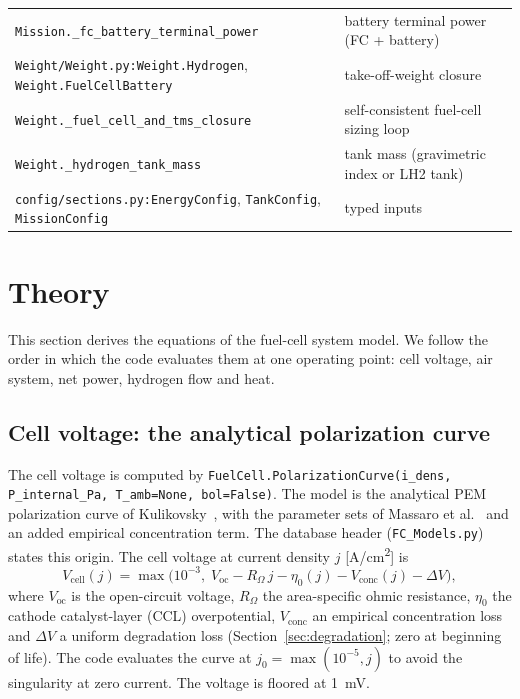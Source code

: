 \documentclass[a4paper,11pt]{article}
\newcommand{\fn}[1]{\nolinkurl{#1}}
\begin{document}
\begin{table}[ht]
\begin{tabularx}{\textwidth}{@{}lX@{}}
\fn{Mission._fc_battery_terminal_power} & battery terminal power (FC + battery) \\
\fn{Weight/Weight.py:Weight.Hydrogen}, \fn{Weight.FuelCellBattery} & take-off-weight closure \\
\fn{Weight._fuel_cell_and_tms_closure} & self-consistent fuel-cell sizing loop \\
\fn{Weight._hydrogen_tank_mass} & tank mass (gravimetric index or LH2 tank) \\
\fn{config/sections.py:EnergyConfig}, \fn{TankConfig}, \fn{MissionConfig} & typed inputs \\
\bottomrule
\end{tabularx}
\end{table}

\section{Theory}
\label{sec:theory}

This section derives the equations of the fuel-cell system model. We follow the order in
which the code evaluates them at one operating point: cell voltage, air system, net power,
hydrogen flow and heat.

\subsection{Cell voltage: the analytical polarization curve}
\label{sec:polcurve}

The cell voltage is computed by \fn{FuelCell.PolarizationCurve(i_dens, P_internal_Pa, T_amb=None, bol=False)}.
The model is the analytical PEM polarization curve of Kulikovsky~\cite{kulikovsky}, with the
parameter sets of Massaro et al.~\cite{massaro} and an added empirical concentration term.
The database header (\fn{FC_Models.py}) states this origin. The cell voltage at current
density $j$ [\si{A/cm^2}] is
\begin{equation}
  V_\mathrm{cell}(j) = \max\!\Big(10^{-3},\;
  V_\mathrm{oc} - R_\Omega\, j - \eta_0(j) - V_\mathrm{conc}(j) - \Delta V\Big),
  \label{eq:vcell}
\end{equation}
where $V_\mathrm{oc}$ is the open-circuit voltage, $R_\Omega$ the area-specific ohmic
resistance, $\eta_0$ the cathode catalyst-layer (CCL) overpotential, $V_\mathrm{conc}$ an
empirical concentration loss and $\Delta V$ a uniform degradation loss
(Section~\ref{sec:degradation}; zero at beginning of life). The code evaluates the curve at
$j_0=\max(10^{-5}, j)$ to avoid the singularity at zero current. The voltage is floored at
\SI{1}{mV}.
\end{document}
